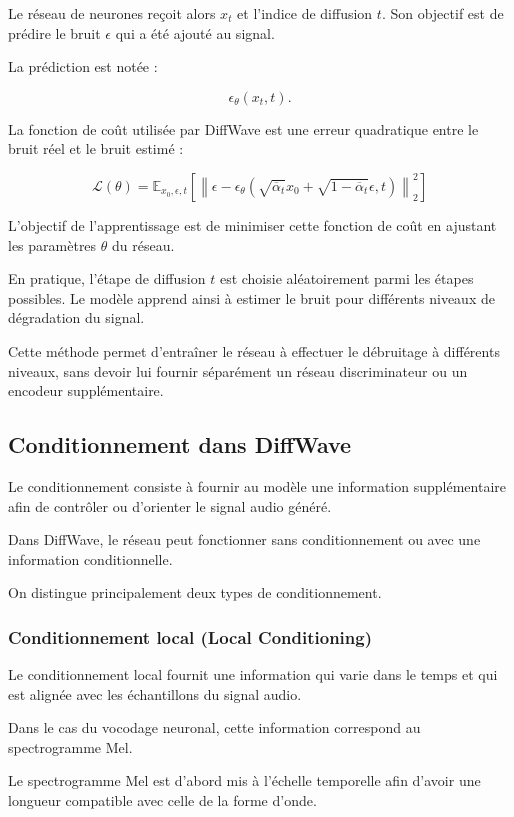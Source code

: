 Le réseau de neurones reçoit alors $x_t$ et l'indice
de diffusion $t$. Son objectif est de prédire le bruit
$\epsilon$ qui a été ajouté au signal.

La prédiction est notée :

\[
\epsilon_{\theta}(x_t,t).
\]

La fonction de coût utilisée par DiffWave est une erreur
quadratique entre le bruit réel et le bruit estimé :

\[
\boxed{
\mathcal{L}(\theta)=
\mathbb{E}_{x_0,\epsilon,t}
\left[
\left\|
\epsilon-
\epsilon_{\theta}
\left(
\sqrt{\overline{\alpha}_t}x_0+
\sqrt{1-\overline{\alpha}_t}\epsilon,
t
\right)
\right\|_2^2
\right]
}
\]

L'objectif de l'apprentissage est de minimiser cette
fonction de coût en ajustant les paramètres $\theta$
du réseau.

En pratique, l'étape de diffusion $t$ est choisie
aléatoirement parmi les étapes possibles. Le modèle
apprend ainsi à estimer le bruit pour différents niveaux
de dégradation du signal.

Cette méthode permet d'entraîner le réseau à effectuer
le débruitage à différents niveaux, sans devoir lui
fournir séparément un réseau discriminateur ou un
encodeur supplémentaire.

\subsection{Conditionnement dans DiffWave}

Le conditionnement consiste à fournir au modèle une
information supplémentaire afin de contrôler ou
d'orienter le signal audio généré.

Dans DiffWave, le réseau peut fonctionner sans
conditionnement ou avec une information conditionnelle.

On distingue principalement deux types de conditionnement.

\subsubsection{Conditionnement local (Local Conditioning)}

Le conditionnement local fournit une information qui
varie dans le temps et qui est alignée avec les
échantillons du signal audio.

Dans le cas du vocodage neuronal, cette information
correspond au spectrogramme Mel.

Le spectrogramme Mel est d'abord mis à l'échelle
temporelle afin d'avoir une longueur compatible avec
celle de la forme d'onde.

